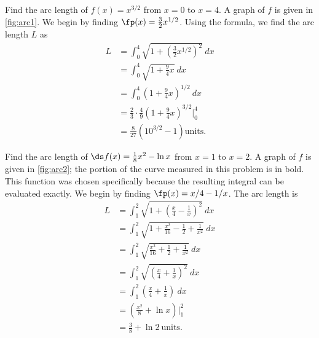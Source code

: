 \begin{example}\label{ex_arc1}
Find the arc length of $f(x) = x^{3/2}$ from $x=0$ to $x=4$.
\solution
A graph of $f$ is given in \autoref{fig:arc1}.
We begin by finding $\fp(x)= \frac32x^{1/2}$. Using the formula, we find the arc length $L$ as
\begin{align*}
	L
	&=	\int_0^4 \sqrt{1+\left(\frac32x^{1/2}\right)^2}\ dx \\
	&=	\int_0^4 \sqrt{1+\frac94x} \ dx \\
	&= 	\int_0^4 \left(1+\frac94x\right)^{1/2}\ dx \\
	&=  \frac23\cdot\frac49\left(1+\frac94x\right)^{3/2}\Big|_0^4 \\
	&=	\frac{8}{27}\left(10^{3/2}-1\right)\text{units}. %
\end{align*}
\end{example}

\begin{example}\label{ex_arc2}
Find the arc length of $\ds f(x) =\frac18x^2-\ln x$ from $x=1$ to $x=2$.
\solution
A graph of $f$ is given in \autoref{fig:arc2}; the portion of the curve measured in this problem is in bold.
This function was chosen specifically because the resulting integral can be evaluated exactly. We begin by finding $\fp(x) = x/4-1/x$. The arc length is 
\begin{align*}
	L
	&=  \int_1^2 \sqrt{1+ \left(\frac x4-\frac1x\right)^2}\ dx \\
	&= 	\int_1^2 \sqrt{ 1 + \frac{x^2}{16} -\frac12 + \frac1{x^2} } \ dx \\
	&=	\int_1^2 \sqrt{ \frac{x^2}{16} +\frac12 + \frac1{x^2} } \ dx \\
	&=	\int_1^2	\sqrt{ \left(\frac x4 + \frac1x\right)^2 }\ dx \\
	&= \int_1^2 \left(\frac x4 + \frac1x\right) \ dx \\
	&=  \left(\frac{x^2}8 + \ln x\right)\Bigg|_1^2\\
	&=	\frac38+\ln 2\ \text{units}. %
\end{align*}
\end{example}

